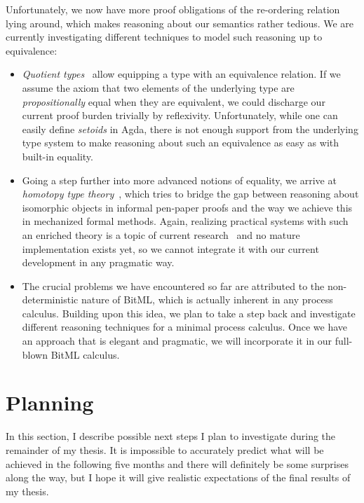 \documentclass[acmsmall,nonacm=true,screen=true]{acmart}
\begin{document}
Unfortunately, we now have more proof obligations of the re-ordering relation lying around, which makes reasoning about
our semantics rather tedious. We are currently investigating different techniques to model such reasoning up to equivalence:
\begin{itemize}
\item \textit{Quotient types}~\cite{quotient} allow equipping a type with an equivalence relation.
If we assume the axiom that two elements of the underlying type are \textit{propositionally} equal when they are equivalent,
we could discharge our current proof burden trivially by reflexivity.
Unfortunately, while one can easily define \textit{setoids} in Agda, there is not enough support from the underlying type system to make reasoning about such an equivalence as easy as with built-in equality.
\item Going a step further into more advanced notions of equality, we arrive at \textit{homotopy type theory}~\cite{homotopy},
which tries to bridge the gap between reasoning about isomorphic objects in informal pen-paper proofs
and the way we achieve this in mechanized formal methods.
Again, realizing practical systems with such an enriched theory is a topic of current research~\cite{cubical} and no mature implementation exists yet, so we cannot integrate it with our current development in any pragmatic way.
\item The crucial problems we have encountered so far are attributed to the non-deterministic nature of BitML, which is actually
inherent in any process calculus. Building upon this idea, we plan to take a step back and investigate different reasoning
techniques for a minimal process calculus. Once we have an approach that is elegant and pragmatic, we will incorporate it
in our full-blown BitML calculus.
\end{itemize}

\section{Planning}
\label{sec:plan}
In this section, I describe possible next steps I plan to investigate during the remainder of my thesis.
It is impossible to accurately predict what will be achieved in the following five months
and there will definitely be some surprises along the way,
but I hope it will give realistic expectations of the final results of my thesis.
\end{document}
